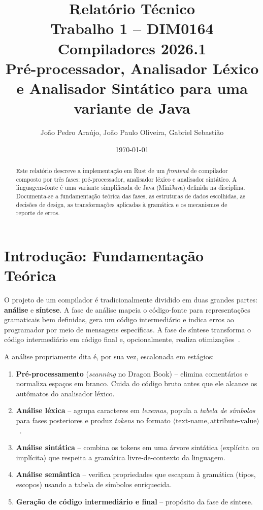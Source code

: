 \documentclass[12pt,a4paper]{article}
\title{\Large\textbf{Relatório Técnico} \\[0.4em]
  \large Trabalho 1 -- DIM0164 Compiladores 2026.1 \\
  Pré-processador, Analisador Léxico e Analisador Sintático para
  uma variante de Java}
\author{João Pedro Araújo, João Paulo Oliveira, Gabriel Sebastião}
\date{\today}
\begin{document}
\maketitle

\begin{abstract}
\noindent Este relatório descreve a implementação em Rust de um \emph{frontend}
de compilador composto por três fases: pré-processador, analisador léxico e
analisador sintático. A linguagem-fonte é uma variante simplificada de Java
(MiniJava) definida na disciplina. Documenta-se a fundamentação teórica das
fases, as estruturas de dados escolhidas, as decisões de design, as
transformações aplicadas à gramática e os mecanismos de reporte de erros.
\end{abstract}

\section{Introdução: Fundamentação Teórica}

O projeto de um compilador é tradicionalmente dividido em duas grandes
partes: \textbf{análise} e \textbf{síntese}. A fase de análise mapeia o
código-fonte para representações gramaticais bem definidas, gera um código
intermediário e indica erros ao programador por meio de mensagens
específicas. A fase de síntese transforma o código intermediário em código
final e, opcionalmente, realiza otimizações~\cite{aho2006compilers}.

A análise propriamente dita é, por sua vez, escalonada em estágios:

\begin{enumerate}
  \item \textbf{Pré-processamento} (\emph{scanning} no Dragon Book) --
    elimina comentários e normaliza espaços em branco. Cuida do código
    bruto antes que ele alcance os autômatos do analisador léxico.
  \item \textbf{Análise léxica} -- agrupa caracteres em \emph{lexemas},
  popula a \emph{tabela de símbolos} para fases posteriores e produz
  \emph{tokens} no formato $\langle\text{text-name}, \text{attribute-value}\rangle$~\cite[\S3.1.3]{aho2006compilers}.
  \item \textbf{Análise sintática} -- combina os tokens em uma árvore
    sintática (explícita ou implícita) que respeita a gramática
    livre-de-contexto da linguagem.
  \item \textbf{Análise semântica} -- verifica propriedades que escapam
    à gramática (tipos, escopos) usando a tabela de símbolos enriquecida.
  \item \textbf{Geração de código intermediário e final} --
    propósito da fase de síntese.
\end{enumerate}
\end{document}
